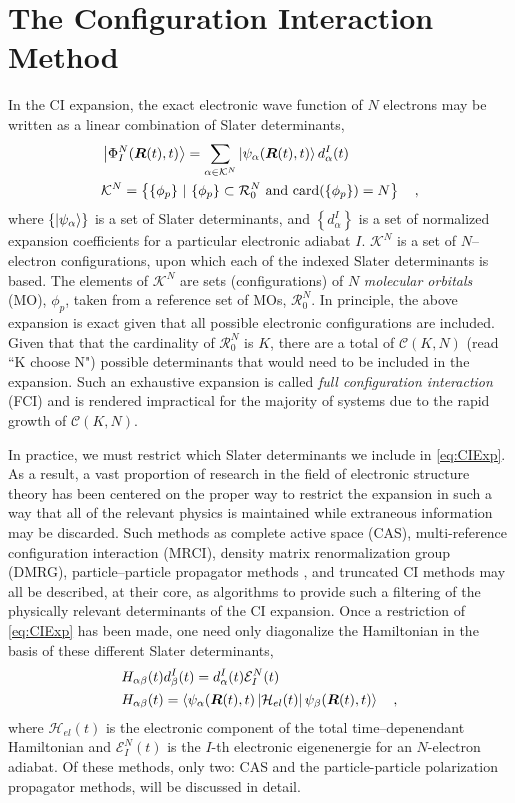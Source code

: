 \section{The Configuration Interaction Method}
\label{sec:ci}

In the CI expansion, the exact electronic wave function of $N$ electrons may be
written as a linear combination of Slater determinants,
\begin{align}
&\left\vert \Phi^N_I (\boldsymbol{R}(t),t) \right\rangle = \sum_{\alpha \in \mathcal{K}^N}  
  \left\vert \psi_\alpha (\boldsymbol{R}(t),t) \right\rangle d^I_\alpha(t)
\label{eq:CIExp} \\
& \mathcal{K}^N = \left\lbrace \{ \phi_p \} \text{ }\vert\text{ } \{ \phi_p \} \subset
\mathcal{R}_0^N \text{ and } \mathrm{card}(\{ \phi_p \}) = N \right\rbrace
\quad ,
\end{align}
where $\left\lbrace\left\vert \psi_\alpha \right\rangle\right\rbrace$ is a set of Slater
determinants, and $\left\lbrace d^I_\alpha \right\rbrace$ is a set of normalized
expansion coefficients for a particular electronic adiabat $I$. $\mathcal{K}^N$ is
a set of $N$--electron configurations, upon which each of the indexed Slater
determinants is based. The elements of $\mathcal{K}^N$ are sets (configurations)
of $N$ \emph{molecular orbitals} (MO), $\phi_p$, taken from a reference set of MOs,
$\mathcal{R}^N_0$.  In principle, the above expansion is exact given that all
possible electronic configurations are included.  Given that that the
cardinality of $\mathcal{R}^N_0$ is $K$, there are a total of $\mathcal{C}(K,N)$
(read ``K choose N") possible determinants that would need to be included in the
expansion. Such an exhaustive expansion is called \emph{full configuration
interaction} (FCI) and is rendered impractical for the majority of systems due
to the rapid growth of $\mathcal{C}(K,N)$.  

In practice, we  must restrict which Slater determinants we include in
\cref{eq:CIExp}. As a result, a vast proportion of research in the field of
electronic structure theory has been centered on the proper way to restrict the
expansion in such a way that all of the relevant physics is maintained while
extraneous information may be discarded. Such methods as complete active space
(CAS), multi-reference configuration interaction (MRCI), density matrix
renormalization group (DMRG), particle--particle propagator methods , and
truncated CI methods may all be described, at their core, as algorithms to
provide such a filtering of the physically relevant determinants of the CI
expansion.  Once a restriction of \cref{eq:CIExp} has been made, one need only
diagonalize the Hamiltonian in the basis of these different Slater determinants,
\begin{align}
&H_{\alpha\beta}(t) d_\beta^I(t) = d_\alpha^I(t) \mathcal{E}^N_I(t)
\label{eq:CIEig}\\
&H_{\alpha\beta}(t) =
\left\langle \psi_\alpha(\boldsymbol{R}(t),t) \left\vert \mathcal{H}_{el}(t) \right\vert \psi_\beta(\boldsymbol{R}(t),t) \right\rangle
\quad,
\end{align}
where $\mathcal{H}_{el}(t)$ is the electronic component of the total
time--depenendant Hamiltonian and $\mathcal{E}^N_I(t)$ is the $I$-th electronic
eigenenergie for an $N$-electron adiabat. 
Of these methods, only two: CAS and the particle-particle polarization
propagator methods, will be discussed in detail. 

